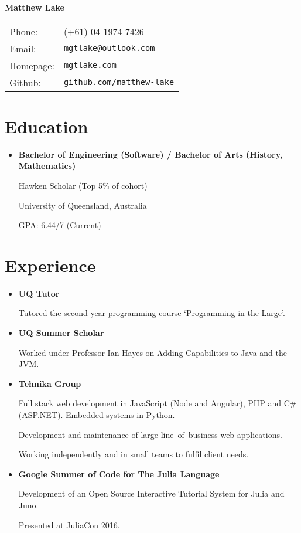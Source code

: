 \documentclass[a4paper]{article}
\def\name{Matthew Lake}
\newcommand{\dateitem}[1] {\item[\textbf{#1 :}]}
\begin{document}
\centerline{\huge \bf \name}

\begin{center}
	\begin{tabular}{ll}
		Phone: 		& (+61) 04 1974 7426 \\
		Email: 		& \href{mailto:mgtlake@outlook.com}{\tt mgtlake@outlook.com} \\
		Homepage: 	& \href{mgtlake.com}{\tt mgtlake.com} \\
		Github:		& \href{github.com/matthew-lake}{\tt github.com/matthew-lake}
	\end{tabular}
\end{center}

\section*{Education}
\begin{itemize}
	\dateitem{2014 -- 2019} {\textbf{Bachelor of Engineering (Software) /
			Bachelor of Arts (History, Mathematics)}
		
		Hawken Scholar (Top 5\% of cohort)
		
		University of Queensland, Australia
		
		GPA: 6.44/7 (Current)
	}
	
\end{itemize}

\section*{Experience}
\begin{itemize}
	\dateitem{2017} {\textbf{UQ Tutor}
		
		Tutored the second year programming course `Programming in the Large'.
	}
	
	\dateitem{2016 -- 2017} {\textbf{UQ Summer Scholar}
		
		Worked under Professor Ian Hayes on Adding Capabilities to Java and the JVM.
	}

	\dateitem{2014 -- 2016} {\textbf{Tehnika Group}
		
		Full stack web development in JavaScript (Node and Angular), PHP and C\# (ASP.NET). Embedded systems in Python.
		
		Development and maintenance of large line--of--business web applications.
		
		Working independently and in small teams to fulfil client needs.
	}
	
	\dateitem{2016} {\textbf{Google Summer of Code for The Julia Language}
		
		Development of an Open Source Interactive Tutorial System for Julia and Juno.
		
		Presented at JuliaCon 2016.
	}
	
	
\end{itemize}
\end{document}
